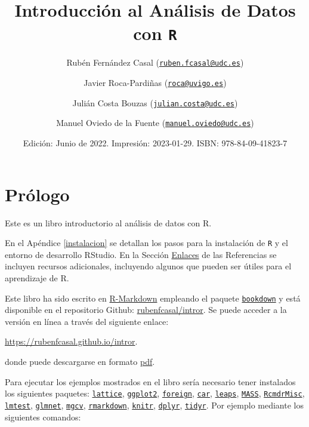 \documentclass[
]{book}
\title{Introducción al Análisis de Datos con \texttt{R}}
\author{Rubén Fernández Casal (\href{mailto:ruben.fcasal@udc.es}{\nolinkurl{ruben.fcasal@udc.es}}) \and Javier Roca-Pardiñas (\href{mailto:roca@uvigo.es}{\nolinkurl{roca@uvigo.es}}) \and Julián Costa Bouzas (\href{mailto:julian.costa@udc.es}{\nolinkurl{julian.costa@udc.es}}) \and Manuel Oviedo de la Fuente (\href{mailto:manuel.oviedo@udc.es}{\nolinkurl{manuel.oviedo@udc.es}})}
\date{Edición: Junio de 2022. Impresión: 2023-01-29. ISBN: 978-84-09-41823-7}
\theoremstyle{break}
\theoremstyle{nonumberplain}
\begin{document}
\maketitle

{
\setcounter{tocdepth}{1}
\tableofcontents
}
\hypertarget{pruxf3logo}{%
\chapter*{Prólogo}\label{pruxf3logo}}

Este es un libro introductorio al análisis de datos con R.

En el Apéndice \ref{instalacion} se detallan los pasos para la instalación de \texttt{R} y el entorno de desarrollo RStudio.
En la Sección \protect\hyperlink{links}{Enlaces} de las Referencias se incluyen recursos adicionales, incluyendo algunos que pueden ser útiles para el aprendizaje de R.

Este libro ha sido escrito en \href{http://rmarkdown.rstudio.com}{R-Markdown} empleando el paquete \href{https://bookdown.org/yihui/bookdown/}{\texttt{bookdown}} y está disponible en el repositorio Github: \href{https://github.com/rubenfcasal/book_remuestreo}{rubenfcasal/intror}.
Se puede acceder a la versión en línea a través del siguiente enlace:

\url{https://rubenfcasal.github.io/intror}.

donde puede descargarse en formato \href{https://rubenfcasal.github.io/intror/Intro_Analisis_Datos_R.pdf}{pdf}.

Para ejecutar los ejemplos mostrados en el libro sería necesario tener instalados los siguientes paquetes:
\href{https://CRAN.R-project.org/package=lattice}{\texttt{lattice}}, \href{https://CRAN.R-project.org/package=ggplot2}{\texttt{ggplot2}}, \href{https://CRAN.R-project.org/package=foreign}{\texttt{foreign}}, \href{https://CRAN.R-project.org/package=car}{\texttt{car}}, \href{https://CRAN.R-project.org/package=leaps}{\texttt{leaps}}, \href{https://CRAN.R-project.org/package=MASS}{\texttt{MASS}}, \href{https://CRAN.R-project.org/package=RcmdrMisc}{\texttt{RcmdrMisc}}, \href{https://CRAN.R-project.org/package=lmtest}{\texttt{lmtest}}, \href{https://CRAN.R-project.org/package=glmnet}{\texttt{glmnet}}, \href{https://CRAN.R-project.org/package=mgcv}{\texttt{mgcv}}, \href{https://CRAN.R-project.org/package=rmarkdown}{\texttt{rmarkdown}}, \href{https://CRAN.R-project.org/package=knitr}{\texttt{knitr}}, \href{https://CRAN.R-project.org/package=dplyr}{\texttt{dplyr}}, \href{https://CRAN.R-project.org/package=tidyr}{\texttt{tidyr}}.
Por ejemplo mediante los siguientes comandos:
\end{document}

